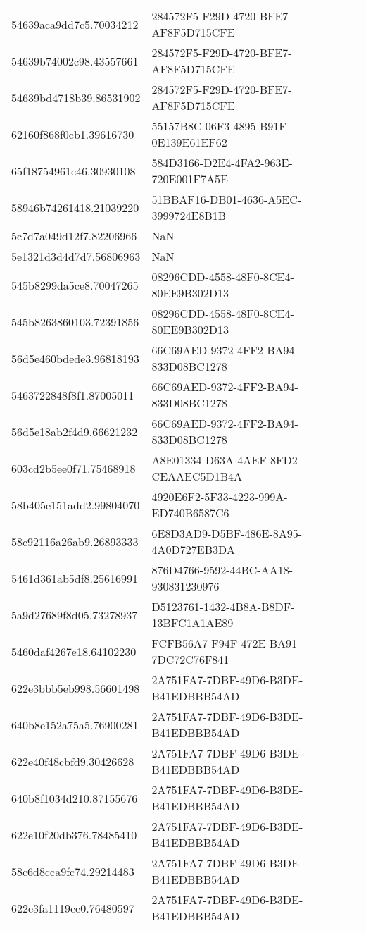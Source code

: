 \begin{tabular}{ll}
54639aca9dd7c5.70034212 & 284572F5-F29D-4720-BFE7-AF8F5D715CFE \\
54639b74002c98.43557661 & 284572F5-F29D-4720-BFE7-AF8F5D715CFE \\
54639bd4718b39.86531902 & 284572F5-F29D-4720-BFE7-AF8F5D715CFE \\
62160f868f0cb1.39616730 & 55157B8C-06F3-4895-B91F-0E139E61EF62 \\
65f18754961c46.30930108 & 584D3166-D2E4-4FA2-963E-720E001F7A5E \\
58946b74261418.21039220 & 51BBAF16-DB01-4636-A5EC-3999724E8B1B \\
5c7d7a049d12f7.82206966 & NaN \\
5e1321d3d4d7d7.56806963 & NaN \\
545b8299da5ce8.70047265 & 08296CDD-4558-48F0-8CE4-80EE9B302D13 \\
545b8263860103.72391856 & 08296CDD-4558-48F0-8CE4-80EE9B302D13 \\
56d5e460bdede3.96818193 & 66C69AED-9372-4FF2-BA94-833D08BC1278 \\
5463722848f8f1.87005011 & 66C69AED-9372-4FF2-BA94-833D08BC1278 \\
56d5e18ab2f4d9.66621232 & 66C69AED-9372-4FF2-BA94-833D08BC1278 \\
603cd2b5ee0f71.75468918 & A8E01334-D63A-4AEF-8FD2-CEAAEC5D1B4A \\
58b405e151add2.99804070 & 4920E6F2-5F33-4223-999A-ED740B6587C6 \\
58c92116a26ab9.26893333 & 6E8D3AD9-D5BF-486E-8A95-4A0D727EB3DA \\
5461d361ab5df8.25616991 & 876D4766-9592-44BC-AA18-930831230976 \\
5a9d27689f8d05.73278937 & D5123761-1432-4B8A-B8DF-13BFC1A1AE89 \\
5460daf4267e18.64102230 & FCFB56A7-F94F-472E-BA91-7DC72C76F841 \\
622e3bbb5eb998.56601498 & 2A751FA7-7DBF-49D6-B3DE-B41EDBBB54AD \\
640b8e152a75a5.76900281 & 2A751FA7-7DBF-49D6-B3DE-B41EDBBB54AD \\
622e40f48cbfd9.30426628 & 2A751FA7-7DBF-49D6-B3DE-B41EDBBB54AD \\
640b8f1034d210.87155676 & 2A751FA7-7DBF-49D6-B3DE-B41EDBBB54AD \\
622e10f20db376.78485410 & 2A751FA7-7DBF-49D6-B3DE-B41EDBBB54AD \\
58c6d8cca9fc74.29214483 & 2A751FA7-7DBF-49D6-B3DE-B41EDBBB54AD \\
622e3fa1119ce0.76480597 & 2A751FA7-7DBF-49D6-B3DE-B41EDBBB54AD \\

\end{tabular}
